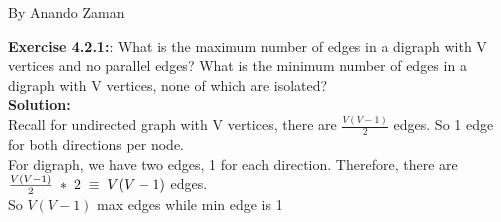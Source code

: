 \documentclass[11pt,fleqn]{article}
\begin{document}
By Anando Zaman

\textbf{Exercise 4.2.1:}: What is the maximum number of edges in a digraph with V vertices and no parallel
edges? What is the minimum number of edges in a digraph with V vertices, none of
which are isolated?\\

\textbf{Solution:}\\
Recall for undirected graph with V vertices, there are $\frac{V(V-1)}{2}$ edges. So 1 edge for both directions per node.\\

For digraph, we have two edges, 1 for each direction. Therefore, there are $\frac{V(V-1)}{2} \thickspace * \thickspace 2 \thickspace \equiv \thickspace V(V-1)$ edges.\\

So $V(V-1)$ max edges while min edge is 1

	
\end{document}
